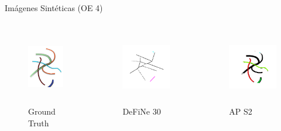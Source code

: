 \begin{frame}{Im\'agenes Sint\'eticas (OE 4)}

    \begin{columns}
        \begin{column}{0.31\textwidth}
        \vspace{-0.5cm}
            \begin{figure}
                \centering
                \includegraphics[height=1.3in]{Pictures/define-weighted-4-groundTruth.png}
                \caption{Ground Truth}
            \end{figure}
        \end{column}
        \begin{column}{0.31\textwidth}
        \vspace{-1cm}
            \begin{figure}
                \centering
                \includegraphics[height=1.3in]{Pictures/defineFig1b-DeFiNeExactMatch-30.png}
                \caption{DeFiNe 30\textdegree}
            \end{figure}
        \end{column}
        \begin{column}{0.31\textwidth}
        \vspace{-1cm}
            \begin{figure}
                \centering
                \includegraphics[height=1.3in]{Pictures/define-weighted-4-phil-s3389-v056-exactMatch-antLabeled.png}
                \caption{AP S2}
            \end{figure}
        \end{column}
    \end{columns}


\end{frame}
